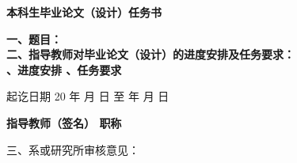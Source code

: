 \cleardoublepage{}
{
  \begin{center}
    {\bfseries\fangsong{} 本科生毕业论文（设计）任务书}
  \end{center}
}
{
}

{
    \bfseries
    \noindent 一、题目：\\
    \noindent 二、指导教师对毕业论文（设计）的进度安排及任务要求：\\
    {
      、进度安排
      \vskip 60mm
      、任务要求
      \vskip 40mm
    }
    {
      \vskip 50mm
    }

    \noindent 起讫日期 20 \quad 年 \quad  月 \quad  日 \quad 至  \quad  年 \quad  月  \quad 日
    \begin{flushright}
        \bfseries {}
            指导教师（签名） \underline{} 职称 \underline{}
    \end{flushright}

    \noindent 三、系或研究所审核意见：\\

    \mbox{} \vfill
    \signature{负责人（签名）}
}
